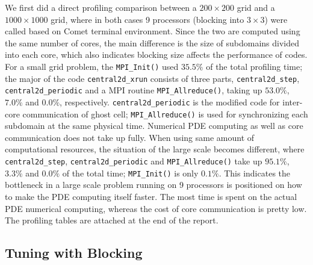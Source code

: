 \documentclass{article}
\begin{document}
We first did a direct profiling comparison between a $200\times200$ grid and a $1000\times1000$ grid, where in both cases 9 processors (blocking into $3\times3$) were called based on Comet terminal environment. Since the two are computed using the same number of cores, the main difference is the size of subdomains divided into each core, which also indicates blocking size affects the performance of codes. For a small grid problem, the \texttt{MPI\_Init()} used $35.5\%$ of the total profiling time; the major of the code \texttt{central2d\_xrun} consists of three parts, \texttt{central2d\_step}, \texttt{central2d\_periodic} and a MPI routine \texttt{MPI\_Allreduce()}, taking up $53.0\%$, $7.0\%$ and $0.0\%$, respectively. \texttt{central2d\_periodic} is the modified code for inter-core communication of ghost cell; \texttt{MPI\_Allreduce()} is used for synchronizing each subdomain at the same physical time. Numerical PDE computing as well as core communication does not take up fully.  When using same amount of computational resources, the situation of the large scale becomes different, where  \texttt{central2d\_step}, \texttt{central2d\_periodic} and  \texttt{MPI\_Allreduce()} take up $95.1\%$, $3.3\%$ and $0.0\%$ of the total time; \texttt{MPI\_Init()}  is only $0.1\%$. This indicates the bottleneck in a large scale problem running on 9 processors is positioned on how to make the PDE computing itself faster. The most time is spent on the actual PDE numerical computing, whereas the cost of core communication is pretty low. The profiling tables are attached at the end of the report.

\subsection{Tuning with Blocking}
\end{document}
